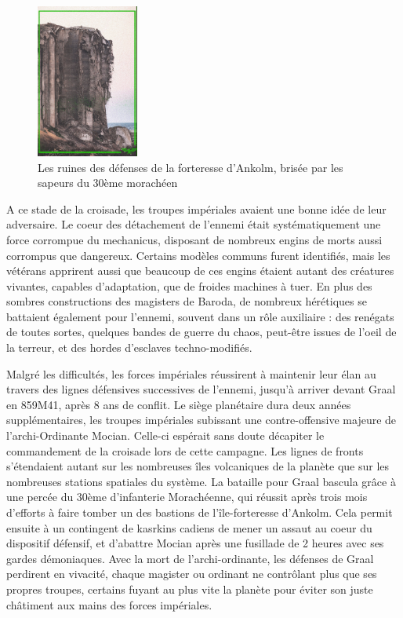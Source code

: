 \documentclass[10pt,a4paper]{book}
\begin{document}
\begin{figure}
  \centering
  \includegraphics[width = 0.3\textwidth]{ruines 1.jpeg}
  \caption{Les ruines des défenses de la forteresse d'Ankolm, brisée par les sapeurs du 30ème morachéen}
\end{figure}

A ce stade de la croisade, les troupes impériales avaient une bonne idée de leur adversaire. Le coeur des détachement de l'ennemi était systématiquement une force corrompue du mechanicus, disposant de nombreux engins de morts aussi corrompus que dangereux. Certains modèles communs furent identifiés, mais les vétérans apprirent aussi que beaucoup de ces engins étaient autant des créatures vivantes, capables d'adaptation, que de froides machines à tuer. En plus des sombres constructions des magisters de Baroda, de nombreux hérétiques se battaient également pour l'ennemi, souvent dans un rôle auxiliaire : des renégats de toutes sortes, quelques bandes de guerre du chaos, peut-être issues de l'oeil de la terreur, et des hordes d'esclaves techno-modifiés.



Malgré les difficultés, les forces impériales réussirent à maintenir leur élan au travers des lignes défensives successives de l'ennemi, jusqu'à arriver devant Graal en 859M41, après 8 ans de conflit. Le siège planétaire dura deux années supplémentaires, les troupes impériales subissant une contre-offensive majeure de l'archi-Ordinante Mocian. Celle-ci espérait sans doute décapiter le commandement de la croisade lors de cette campagne. Les lignes de fronts s'étendaient autant sur les nombreuses îles volcaniques de la planète que sur les nombreuses stations spatiales du système. La bataille pour Graal bascula grâce à une percée du 30ème d'infanterie Morachéenne, qui réussit après trois mois d'efforts à faire tomber un des bastions de l'île-forteresse d'Ankolm. Cela permit ensuite à un contingent de kasrkins cadiens de mener un assaut au coeur du dispositif défensif, et d'abattre Mocian après une fusillade de 2 heures avec ses gardes démoniaques. Avec la mort de l'archi-ordinante, les défenses de Graal perdirent en vivacité, chaque magister ou ordinant ne contrôlant plus que ses propres troupes, certains fuyant au plus vite la planète pour éviter son juste châtiment aux mains des forces impériales.
\end{document}
